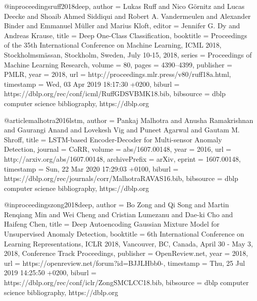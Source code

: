 @inproceedings{ruff2018deep,
  author    = {Lukas Ruff and
               Nico G{\"{o}}rnitz and
               Lucas Deecke and
               Shoaib Ahmed Siddiqui and
               Robert A. Vandermeulen and
               Alexander Binder and
               Emmanuel M{\"{u}}ller and
               Marius Kloft},
  editor    = {Jennifer G. Dy and
               Andreas Krause},
  title     = {Deep One-Class Classification},
  booktitle = {Proceedings of the 35th International Conference on Machine Learning,
               {ICML} 2018, Stockholmsm{\"{a}}ssan, Stockholm, Sweden, July
               10-15, 2018},
  series    = {Proceedings of Machine Learning Research},
  volume    = {80},
  pages     = {4390--4399},
  publisher = {{PMLR}},
  year      = {2018},
  url       = {http://proceedings.mlr.press/v80/ruff18a.html},
  timestamp = {Wed, 03 Apr 2019 18:17:30 +0200},
  biburl    = {https://dblp.org/rec/conf/icml/RuffGDSVBMK18.bib},
  bibsource = {dblp computer science bibliography, https://dblp.org}
}

@article{malhotra2016lstm,
  author    = {Pankaj Malhotra and
               Anusha Ramakrishnan and
               Gaurangi Anand and
               Lovekesh Vig and
               Puneet Agarwal and
               Gautam M. Shroff},
  title     = {LSTM-based Encoder-Decoder for Multi-sensor Anomaly Detection},
  journal   = {CoRR},
  volume    = {abs/1607.00148},
  year      = {2016},
  url       = {http://arxiv.org/abs/1607.00148},
  archivePrefix = {arXiv},
  eprint    = {1607.00148},
  timestamp = {Sun, 22 Mar 2020 17:29:03 +0100},
  biburl    = {https://dblp.org/rec/journals/corr/MalhotraRAVAS16.bib},
  bibsource = {dblp computer science bibliography, https://dblp.org}
}

@inproceedings{zong2018deep,
  author    = {Bo Zong and
               Qi Song and
               Martin Renqiang Min and
               Wei Cheng and
               Cristian Lumezanu and
               Dae{-}ki Cho and
               Haifeng Chen},
  title     = {Deep Autoencoding Gaussian Mixture Model for Unsupervised Anomaly
               Detection},
  booktitle = {6th International Conference on Learning Representations, {ICLR} 2018,
               Vancouver, BC, Canada, April 30 - May 3, 2018, Conference Track Proceedings},
  publisher = {OpenReview.net},
  year      = {2018},
  url       = {https://openreview.net/forum?id=BJJLHbb0-},
  timestamp = {Thu, 25 Jul 2019 14:25:50 +0200},
  biburl    = {https://dblp.org/rec/conf/iclr/ZongSMCLCC18.bib},
  bibsource = {dblp computer science bibliography, https://dblp.org}
}

